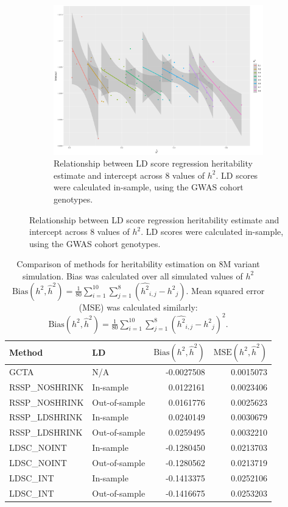   \begin{figure}
      \centering
  \begin{subfigure}[t]{\textwidth}
    \centering
    \includegraphics[width=.9\linewidth]{img/intercept_bias.png}
    \caption{Relationship between LD score regression heritability estimate and intercept across 8 values of $h^2$.  LD scores were calculated in-sample, using the GWAS cohort genotypes.}\label{fig:ldsc_neg_bias}
  \end{subfigure}
\end{figure}



\begin{table}
\begin{tabular}{l|l|r|r}
\hline
Method & LD & $\text{Bias}(h^2,\hat{h}^2)$ & $\text{MSE}(h^2,\hat{h}^2)$\\
\hline
GCTA & N/A & -0.0027508 & 0.0015073\\
\hline
RSSP\_NOSHRINK & In-sample & 0.0122161 & 0.0023406\\
\hline
RSSP\_NOSHRINK & Out-of-sample & 0.0161776 & 0.0025623\\
\hline
RSSP\_LDSHRINK & In-sample & 0.0240149 & 0.0030679\\
\hline
RSSP\_LDSHRINK & Out-of-sample & 0.0259495 & 0.0032210\\
\hline
LDSC\_NOINT & In-sample & -0.1280450 & 0.0213703\\
\hline
LDSC\_NOINT & Out-of-sample & -0.1280562 & 0.0213719\\
\hline
LDSC\_INT & In-sample & -0.1413375 & 0.0252106\\
\hline
LDSC\_INT & Out-of-sample & -0.1416675 & 0.0253203\\
\hline
\end{tabular}\label{tab:gwas_sim_ave_error}
\caption{Comparison of methods for heritability estimation on 8M variant simulation.  Bias was calculated over all simulated values of $h^2$ $\text{Bias}(h^2,\hat{h}^2)=\frac{1}{80}\sum_{i=1}^{10}\sum_{j=1}^{8}(\hat{h^2}_{i,j}-{h^2}_j)$.   Mean squared error (MSE) was calculated similarly: $\text{Bias}(h^2,\hat{h}^2)=\frac{1}{80}\sum_{i=1}^{10}\sum_{j=1}^{8}{(\hat{h^2}_{i,j}-{h^2}_j)}^2$.}
\end{table}

